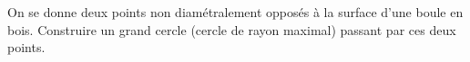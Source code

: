 On se donne deux points non diamétralement opposés à la surface d'une boule en bois. Construire un grand cercle (cercle de rayon maximal) passant par ces deux points.

